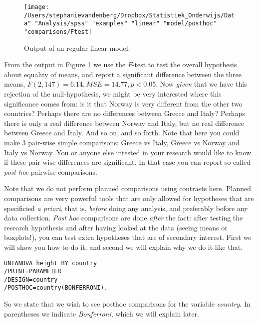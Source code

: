 \begin{figure}[h]
    \begin{center}
       \texttt{[image: /Users/stephanievandenberg/Dropbox/Statistiek\_Onderwijs/Data" "Analysis/spss" "examples" "linear" "model/posthoc" "comparisons/Ftest]}
    \end{center}
    \label{fig:Ftest}
    \caption{Output of an regular linear model.}
\end{figure}


From the output in Figure \ref{fig:Ftest} we use the $F$-test to test the overall hypothesis about equality of means, and report a significant difference between the three means, $F(2, 147)=6.14 , MSE=14.77, p<0.05$. Now \textit{given} that we have this rejection of the null-hypothesis, we might be very interested where this significance comes from: is it that Norway is very different from the other two countries? Perhaps there are no differences between Greece and Italy? Perhaps there is only a real difference between Norway
and Italy, but no real difference between Greece and Italy. And so on, and so forth. Note that here you could make 3 pair-wise simple comparisons: Greece vs Italy, Greece vs Norway and Italy vs Norway. You or anyone else intested in your research would like to know if these pair-wise differences are significant. In that case you can report so-called \textit{post hoc} pairwise comparisons. 

Note that we do not perform planned comparisons using contrasts here. Planned comparisons are very powerful tools that are only allowed for hypotheses that are specificied \textit{a priori}, that is, \textit{before} doing any analysis, and preferably before any data collection. \textit{Post hoc} comparisons are done \textit{after} the fact: after testing the research hypothesis and after having looked at the data (seeing means or boxplots!), you can test extra hypotheses that are of secondary interest. First we will show you how to do it, and second we will explain why we do it like that. 

\begin{verbatim}
UNIANOVA height BY country
/PRINT=PARAMETER
/DESIGN=country
/POSTHOC=country(BONFERRONI).
\end{verbatim}

So we state that we wish to see posthoc comparisons for the variable \textit{country}. In parentheses we indicate \textit{Bonferroni}, which we will explain later.

